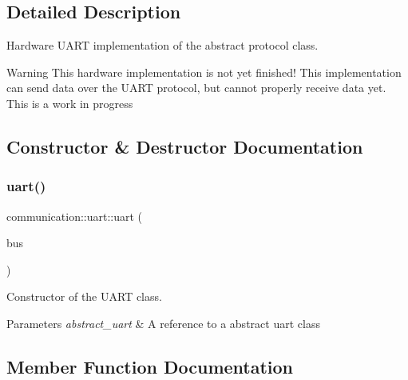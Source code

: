 \subsection{Detailed Description}
Hardware U\+A\+RT implementation of the abstract protocol class. 

\begin{DoxyWarning}{Warning}
This hardware implementation is not yet finished! This implementation can send data over the U\+A\+RT protocol, but cannot properly receive data yet. This is a work in progress 
\end{DoxyWarning}


\subsection{Constructor \& Destructor Documentation}
\mbox{\label{classcommunication_1_1uart_a6d657ea9323428aae6737ca31c206bb1}} 
\subsubsection{\texorpdfstring{uart()}{uart()}}
{\footnotesize\ttfamily communication\+::uart\+::uart (\begin{DoxyParamCaption}\item[{\hyperlink{classuart__abstract}{uart\+\_\+abstract} \&}]{bus }\end{DoxyParamCaption})}



Constructor of the U\+A\+RT class. 


\begin{DoxyParams}{Parameters}
{\em abstract\+\_\+uart} & A reference to a abstract uart class \\
\hline
\end{DoxyParams}


\subsection{Member Function Documentation}
\mbox{\label{classcommunication_1_1uart_a37a51dcb95fb5178b5fa441acd437ae4}} 
